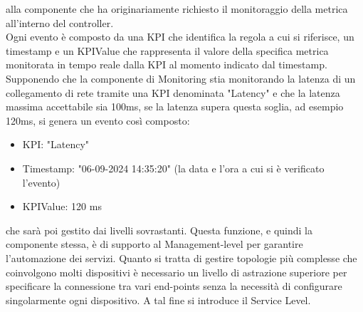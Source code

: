 alla componente che ha
originariamente richiesto il monitoraggio della metrica all'interno del controller.
\\Ogni evento è composto da una KPI che identifica la regola a cui si riferisce, un timestamp e un KPIValue che rappresenta il valore della specifica metrica monitorata in tempo reale dalla KPI al momento indicato dal timestamp.
Supponendo che la componente di Monitoring stia monitorando la latenza di un collegamento di rete tramite una KPI denominata "Latency" e che la latenza massima accettabile sia 100ms,
se la latenza supera questa soglia, ad esempio 120ms, si genera un evento così composto: 
\begin{itemize}
    \item KPI: "Latency"
    \item Timestamp: "06-09-2024 14:35:20" (la data e l'ora a cui si è verificato l'evento)
    \item KPIValue: 120 ms
\end{itemize}
che sarà poi gestito dai livelli sovrastanti.
Questa funzione, e quindi la componente stessa, è di supporto al Management-level per garantire l'automazione dei servizi.
Quanto si tratta di gestire topologie più complesse che coinvolgono molti dispositivi è necessario un livello di astrazione superiore per specificare la connessione tra vari end-points
senza la necessità di configurare singolarmente ogni dispositivo. 
A tal fine si introduce il Service Level. 

